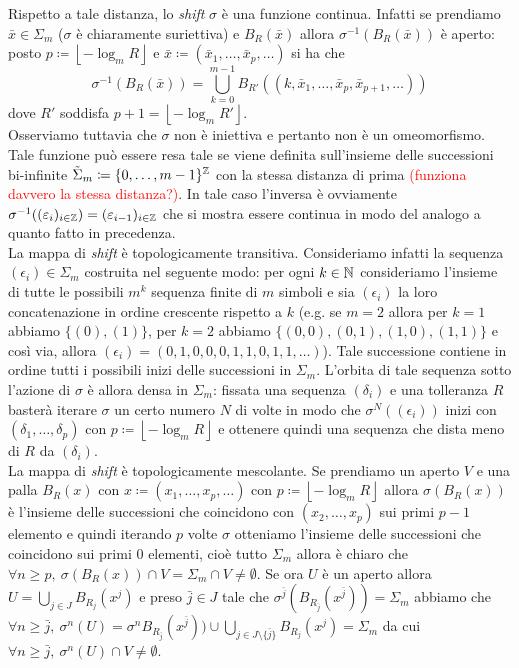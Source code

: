 Rispetto a tale distanza, lo \emph{shift} $ \sigma $ è una funzione continua. Infatti se prendiamo $ \bar{x} \in \Sigma_m $ ($ \sigma $ è chiaramente suriettiva) e $ B_R(\bar{x}) $ allora $ \sigma^{-1}(B_R(\bar{x})) $ è aperto: posto $ p \coloneqq \left \lfloor -\log_m{R} \right \rfloor $ e $ \bar{x} \coloneqq (\bar{x}_1, \ldots, \bar{x}_p, \ldots) $ si ha che
\[
\sigma^{-1}(B_R(\bar{x})) = \bigcup_{k = 0}^{m-1} B_{R'}((k, \bar{x}_1, \ldots, \bar{x}_p, \bar{x}_{p+1}, \ldots))
\]
dove $ R' $ soddisfa $ p+1 = \left \lfloor -\log_m{R'} \right \rfloor $. \\
Osserviamo tuttavia che $ \sigma $ non è iniettiva e pertanto non è un omeomorfismo. Tale funzione può essere resa tale se viene definita sull'insieme delle successioni bi-infinite $ \tilde{\Sigma}_m \coloneqq \{0, \ldots, m-1\}^{\mathbb{Z}} $ con la stessa distanza di prima \textcolor{red}{(funziona davvero la stessa distanza?)}. In tale caso l'inversa è ovviamente $ \sigma^{-1}((\varepsilon_i)_{i \in \mathbb{Z}}) = (\varepsilon_{i - 1})_{i \in \mathbb{Z}} $ che si mostra essere continua in modo del analogo a quanto fatto in precedenza. \\

La mappa di \emph{shift} è topologicamente transitiva. Consideriamo infatti la sequenza $ (\epsilon_i) \in \Sigma_m $ costruita nel seguente modo: per ogni $ k \in \mathbb{N} $ consideriamo l'insieme di tutte le possibili $ m^k $ sequenza finite di $ m $ simboli e sia $ (\epsilon_i) $ la loro concatenazione in ordine crescente rispetto a $ k $ (e.g. se $ m = 2 $ allora per $ k = 1 $ abbiamo $ \{(0), (1)\} $, per $ k = 2 $ abbiamo $ \{(0, 0), (0, 1), (1, 0), (1, 1)\} $ e così via, allora $ (\epsilon_i) = (0, 1, 0, 0, 0, 1, 1, 0, 1, 1, \ldots) $). Tale successione contiene in ordine tutti i possibili inizi delle successioni in $ \Sigma_m $. L'orbita di tale sequenza sotto l'azione di $ \sigma $ è allora densa in $ \Sigma_m $: fissata una sequenza $ (\delta_i) $ e una tolleranza $ R $ basterà iterare $ \sigma $ un certo numero $ N $ di volte in modo che $ \sigma^N((\epsilon_i)) $ inizi con $ (\delta_1, \ldots, \delta_p) $ con $ p \coloneqq \left \lfloor -\log_m{R} \right \rfloor $ e ottenere quindi una sequenza che dista meno di $ R $ da $ (\delta_i) $. \\

La mappa di \emph{shift} è topologicamente mescolante. Se prendiamo un aperto $ V $ e una palla $ B_R(x) $ con $ x \coloneqq (x_1, \dots, x_p, \ldots) $ con $ p \coloneqq \left \lfloor -\log_m{R} \right \rfloor $ allora $ \sigma(B_R(x)) $ è l'insieme delle successioni che coincidono con $ (x_2, \ldots, x_p) $ sui primi $ p-1 $ elemento e quindi iterando $ p $ volte $ \sigma $ otteniamo l'insieme delle successioni che coincidono sui primi 0 elementi, cioè tutto $ \Sigma_m $ allora è chiaro che $ \forall n \geq p, \ \sigma(B_R(x)) \cap V = \Sigma_m \cap V \neq \emptyset $. Se ora $ U $ è un aperto allora $ U = \bigcup_{j \in J} B_{R_j}(x^j) $ e preso $ \bar{j} \in J $ tale che $ \sigma^{\bar{j}}(B_{R_{\bar{j}}}(x^{\bar{j}})) = \Sigma_m $ abbiamo che $ \forall n \geq \bar{j}, \ \sigma^n(U) = \sigma^n B_{R_{\bar{j}}} (x^{\bar{j}})) \cup \bigcup_{j \in J\setminus\{\bar{j}\}} B_{R_j}(x^j) = \Sigma_m $ da cui $ \forall n \geq \bar{j}, \ \sigma^n(U) \cap V \neq \emptyset $.

